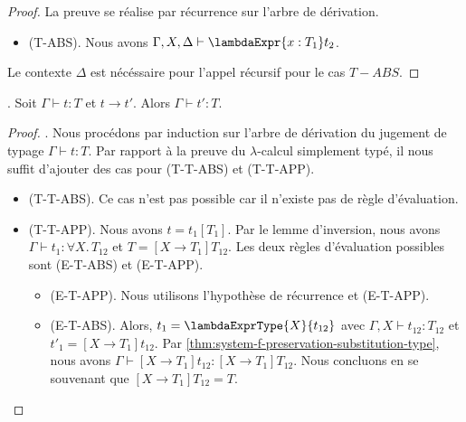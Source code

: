 \begin{proof}
  \label{proof:system-f-preservation-substitution-type}
  La preuve se réalise par récurrence sur l'arbre de dérivation.

  \begin{itemize}
  \item (T-ABS). Nous avons $\Gamma, X, \Delta \vdash \lambdaExpr{x : T_{1}}t_{2}$.
  \end{itemize}
  Le contexte $\Delta$ est nécéssaire pour
  l'appel récursif pour le cas $T-ABS$.
\end{proof}

\begin{theorem} 
  \label{thm:system-f-preservation}.
  Soit $\Gamma \vdash t : T$ et $t \rightarrow t'$. Alors $\Gamma \vdash t' :
  T$.
\end{theorem}

\begin{proof}
  \label{thm:system-f-preservation-proof}. Nous procédons par induction sur
  l'arbre de dérivation du jugement de typage $\Gamma \vdash t : T$. Par rapport
  à la preuve du $\lambda$-calcul simplement typé, il nous
  suffit d'ajouter des cas pour (T-T-ABS) et (T-T-APP).

  \begin{itemize}
  \item (T-T-ABS). Ce cas n'est pas possible car il n'existe pas de règle d'évaluation.
  \item (T-T-APP). Nous avons $t = t_{1}[T_{1}]$. Par le lemme d'inversion, nous
    avons $\Gamma \vdash t_{1} : \forall X . \, T_{12}$ et $T = [X \rightarrow
  T_{1}] T_{12}$. Les deux règles d'évaluation possibles sont (E-T-ABS) et
  (E-T-APP).
    \begin{itemize}
    \item (E-T-APP). Nous utilisons l'hypothèse de récurrence et (E-T-APP).
    \item (E-T-ABS). Alors, $t_{1} = \lambdaExprType{X}{t_{12}}$ avec $\Gamma, X
      \vdash t_{12} : T_{12}$ et $t'_{1} = [X \rightarrow T_{1}] t_{12}$. Par
     \ref{thm:system-f-preservation-substitution-type}, nous avons $\Gamma \vdash
     [X \rightarrow T_{1}] t_{12} : [X \rightarrow T_{1}] T_{12}$. Nous concluons
     en se souvenant que $[X \rightarrow T_{1}]T_{12} = T$.
    \end{itemize}
  \end{itemize}
\end{proof}

